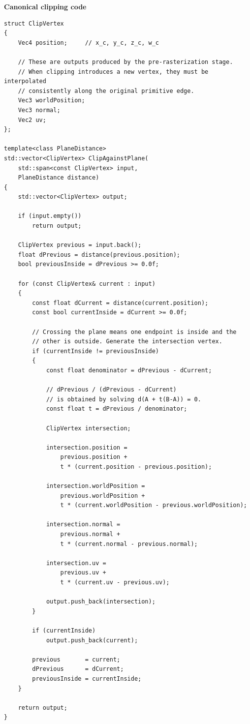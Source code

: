 \textbf{Canonical clipping code}

\begin{verbatim}
struct ClipVertex
{
    Vec4 position;     // x_c, y_c, z_c, w_c

    // These are outputs produced by the pre-rasterization stage.
    // When clipping introduces a new vertex, they must be interpolated
    // consistently along the original primitive edge.
    Vec3 worldPosition;
    Vec3 normal;
    Vec2 uv;
};

template<class PlaneDistance>
std::vector<ClipVertex> ClipAgainstPlane(
    std::span<const ClipVertex> input,
    PlaneDistance distance)
{
    std::vector<ClipVertex> output;

    if (input.empty())
        return output;

    ClipVertex previous = input.back();
    float dPrevious = distance(previous.position);
    bool previousInside = dPrevious >= 0.0f;

    for (const ClipVertex& current : input)
    {
        const float dCurrent = distance(current.position);
        const bool currentInside = dCurrent >= 0.0f;

        // Crossing the plane means one endpoint is inside and the
        // other is outside. Generate the intersection vertex.
        if (currentInside != previousInside)
        {
            const float denominator = dPrevious - dCurrent;

            // dPrevious / (dPrevious - dCurrent)
            // is obtained by solving d(A + t(B-A)) = 0.
            const float t = dPrevious / denominator;

            ClipVertex intersection;

            intersection.position =
                previous.position +
                t * (current.position - previous.position);

            intersection.worldPosition =
                previous.worldPosition +
                t * (current.worldPosition - previous.worldPosition);

            intersection.normal =
                previous.normal +
                t * (current.normal - previous.normal);

            intersection.uv =
                previous.uv +
                t * (current.uv - previous.uv);

            output.push_back(intersection);
        }

        if (currentInside)
            output.push_back(current);

        previous       = current;
        dPrevious      = dCurrent;
        previousInside = currentInside;
    }

    return output;
}
\end{verbatim}


